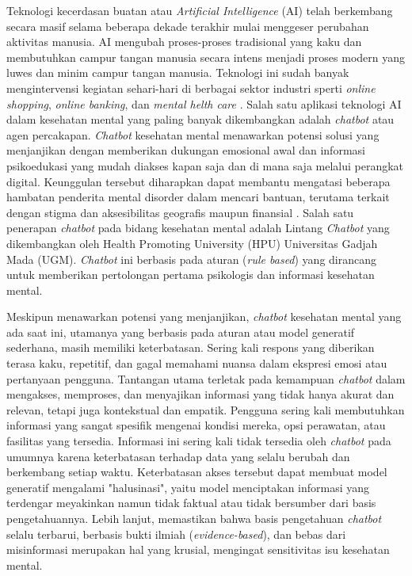 Teknologi kecerdasan buatan atau \textit{Artificial Intelligence} (AI) telah berkembang secara masif selama beberapa dekade terakhir mulai menggeser perubahan aktivitas manusia.
AI mengubah proses-proses tradisional yang kaku dan membutuhkan campur tangan manusia secara intens menjadi proses modern yang luwes dan minim campur tangan manusia.
Teknologi ini sudah banyak mengintervensi kegiatan sehari-hari di berbagai sektor industri sperti \textit{online shopping}, \textit{online banking}, dan \textit{mental helth care} \cite{MultiIndustryAIChatbot}.
Salah satu aplikasi teknologi AI dalam kesehatan mental yang paling banyak dikembangkan adalah \textit{chatbot} atau agen percakapan.
\textit{Chatbot} kesehatan mental menawarkan potensi solusi yang menjanjikan dengan memberikan dukungan emosional awal dan informasi psikoedukasi yang mudah diakses kapan saja dan di mana saja melalui perangkat digital.
Keunggulan tersebut diharapkan dapat membantu mengatasi beberapa hambatan penderita mental disorder dalam mencari bantuan, terutama terkait dengan stigma dan aksesibilitas geografis maupun finansial \cite{CBTWoebotTest}.
Salah satu penerapan \textit{chatbot} pada bidang kesehatan mental adalah Lintang \textit{Chatbot} yang dikembangkan oleh Health Promoting University (HPU) Universitas Gadjah Mada (UGM).
\textit{Chatbot} ini berbasis pada aturan (\textit{rule based}) yang dirancang untuk memberikan pertolongan pertama psikologis dan informasi kesehatan mental.

Meskipun menawarkan potensi yang menjanjikan, \textit{chatbot} kesehatan mental yang ada saat ini, utamanya yang berbasis pada aturan atau model generatif sederhana, masih memiliki keterbatasan.
Sering kali respons yang diberikan terasa kaku, repetitif, dan gagal memahami nuansa dalam ekspresi emosi atau pertanyaan pengguna.
Tantangan utama terletak pada kemampuan \textit{chatbot} dalam mengakses, memproses, dan menyajikan informasi yang tidak hanya akurat dan relevan, tetapi juga kontekstual dan empatik.
Pengguna sering kali membutuhkan informasi yang sangat spesifik mengenai kondisi mereka, opsi perawatan, atau fasilitas yang tersedia.
Informasi ini sering kali tidak tersedia oleh \textit{chatbot} pada umumnya karena keterbatasan terhadap data yang selalu berubah dan berkembang setiap waktu.
Keterbatasan akses tersebut dapat membuat model generatif mengalami "halusinasi", yaitu model menciptakan informasi yang terdengar meyakinkan namun tidak faktual atau tidak bersumber dari basis pengetahuannya.
Lebih lanjut, memastikan bahwa basis pengetahuan \textit{chatbot} selalu terbarui, berbasis bukti ilmiah (\textit{evidence-based}), dan bebas dari misinformasi merupakan hal yang krusial, mengingat sensitivitas isu kesehatan mental.

